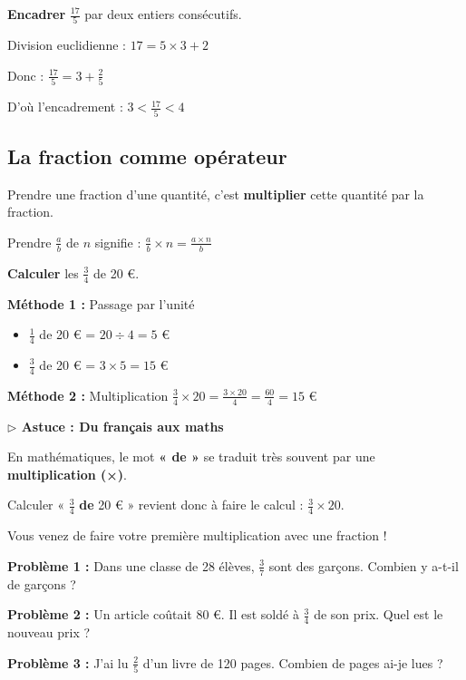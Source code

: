 \begin{examplebox}
	\textbf{Encadrer} $\frac{17}{5}$ par deux entiers consécutifs.
	
	Division euclidienne : $17 = 5 \times 3 + 2$
	
	Donc : $\frac{17}{5} = 3 + \frac{2}{5}$
	
	D'où l'encadrement : $3 < \frac{17}{5} < 4$
\end{examplebox}

\subsection{La fraction comme opérateur}

\begin{definitionbox}
	Prendre une fraction d'une quantité, c'est \textbf{multiplier} cette quantité par la fraction.
	
	Prendre $\frac{a}{b}$ de $n$ signifie : $\frac{a}{b} \times n = \frac{a \times n}{b}$
\end{definitionbox}

\begin{examplebox}
	\textbf{Calculer} les $\frac{3}{4}$ de 20 €.
	
	\textbf{Méthode 1 :} Passage par l'unité
	\begin{itemize}
		\item $\frac{1}{4}$ de 20 € = $20 \div 4 = 5$ €
		\item $\frac{3}{4}$ de 20 € = $3 \times 5 = 15$ €
	\end{itemize}
	
	\textbf{Méthode 2 :} Multiplication
	$\frac{3}{4} \times 20 = \frac{3 \times 20}{4} = \frac{60}{4} = 15 \text{ €}$

	\medskip

	\begin{astucebox}
		\textbf{$\triangleright$ Astuce : Du français aux maths}

		En mathématiques, le mot \textbf{« de »} se traduit très souvent par une \textbf{multiplication (×)}.

		Calculer « $\frac{3}{4}$ \textbf{de} 20 € » revient donc à faire le calcul : $\frac{3}{4} \times 20$.

		Vous venez de faire votre première multiplication avec une fraction !
	\end{astucebox}
\end{examplebox}

\begin{applicationbox}
	\textbf{Problème 1 :} Dans une classe de 28 élèves, $\frac{3}{7}$ sont des garçons. Combien y a-t-il de garçons ?
	
	\medskip
	
	\textbf{Problème 2 :} Un article coûtait 80 €. Il est soldé à $\frac{3}{4}$ de son prix. Quel est le nouveau prix ?
	
	\medskip
	
	\textbf{Problème 3 :} J'ai lu $\frac{2}{5}$ d'un livre de 120 pages. Combien de pages ai-je lues ?
\end{applicationbox}

